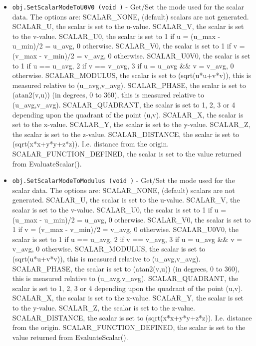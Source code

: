 \begin{itemize}
\item  \verb|obj.SetScalarModeToU0V0 (void )| -  Get/Set the mode used for the scalar data.  The options are:
 SCALAR\_NONE, (default) scalars are not generated.
 SCALAR\_U, the scalar is set to the u-value. 
 SCALAR\_V, the scalar is set to the v-value.
 SCALAR\_U0, the scalar is set to 1 if u = (u\_max - u\_min)/2 = u\_avg, 0 otherwise.
 SCALAR\_V0, the scalar is set to 1 if v = (v\_max - v\_min)/2 = v\_avg, 0 otherwise.
 SCALAR\_U0V0, the scalar is 
   set to 1 if u == u\_avg, 2 if v == v\_avg, 3 if u = u\_avg \&\& v = v\_avg, 0 otherwise.
 SCALAR\_MODULUS, the scalar is set to (sqrt(u*u+v*v)), this is measured relative to (u\_avg,v\_avg).
 SCALAR\_PHASE, the scalar is set to (atan2(v,u)) (in degrees, 0 to 360), this is measured relative to (u\_avg,v\_avg).
 SCALAR\_QUADRANT, the scalar is set to 1, 2, 3 or 4 
   depending upon the quadrant of the point (u,v).
 SCALAR\_X, the scalar is set to the x-value. 
 SCALAR\_Y, the scalar is set to the y-value. 
 SCALAR\_Z, the scalar is set to the z-value. 
 SCALAR\_DISTANCE, the scalar is set to (sqrt(x*x+y*y+z*z)). I.e. distance from the origin.
 SCALAR\_FUNCTION\_DEFINED, the scalar is set to the value returned from EvaluateScalar().

\item  \verb|obj.SetScalarModeToModulus (void )| -  Get/Set the mode used for the scalar data.  The options are:
 SCALAR\_NONE, (default) scalars are not generated.
 SCALAR\_U, the scalar is set to the u-value. 
 SCALAR\_V, the scalar is set to the v-value.
 SCALAR\_U0, the scalar is set to 1 if u = (u\_max - u\_min)/2 = u\_avg, 0 otherwise.
 SCALAR\_V0, the scalar is set to 1 if v = (v\_max - v\_min)/2 = v\_avg, 0 otherwise.
 SCALAR\_U0V0, the scalar is 
   set to 1 if u == u\_avg, 2 if v == v\_avg, 3 if u = u\_avg \&\& v = v\_avg, 0 otherwise.
 SCALAR\_MODULUS, the scalar is set to (sqrt(u*u+v*v)), this is measured relative to (u\_avg,v\_avg).
 SCALAR\_PHASE, the scalar is set to (atan2(v,u)) (in degrees, 0 to 360), this is measured relative to (u\_avg,v\_avg).
 SCALAR\_QUADRANT, the scalar is set to 1, 2, 3 or 4 
   depending upon the quadrant of the point (u,v).
 SCALAR\_X, the scalar is set to the x-value. 
 SCALAR\_Y, the scalar is set to the y-value. 
 SCALAR\_Z, the scalar is set to the z-value. 
 SCALAR\_DISTANCE, the scalar is set to (sqrt(x*x+y*y+z*z)). I.e. distance from the origin.
 SCALAR\_FUNCTION\_DEFINED, the scalar is set to the value returned from EvaluateScalar().


\end{itemize}
